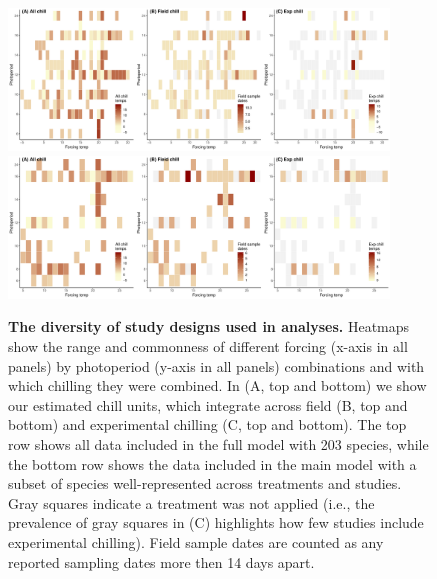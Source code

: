 \documentclass{article}
\begin{document}
\newpage
\begin{figure}[h!]
\centering
\noindent \includegraphics[width=0.9\textwidth]{..//..//analyses/bb_analysis/figures/studydesign/studydesign_heat3panelallsppmodel.pdf}
\noindent \includegraphics[width=0.9\textwidth]{..//..//analyses/bb_analysis/figures/studydesign/studydesign_heat3panelmainmodel.pdf}
\caption{\textbf{The diversity of study designs used in analyses.} Heatmaps show the range and commonness of different forcing (x-axis in all panels) by photoperiod (y-axis in all panels) combinations and with which chilling they were combined. In (A, top and bottom) we show our estimated chill units, which integrate across field (B, top and bottom) and experimental chilling (C, top and bottom). The top row shows all data included in the full model with 203 species, while the bottom row shows the data included in the main model with a subset of species well-represented across treatments and studies. Gray squares indicate a treatment was not applied (i.e., the prevalence of gray squares in (C) highlights how few studies include experimental chilling). Field sample dates are counted as any reported sampling dates more then 14 days apart.}
\label{fig:treatheatmaps} %
\end{figure}
\end{document}
